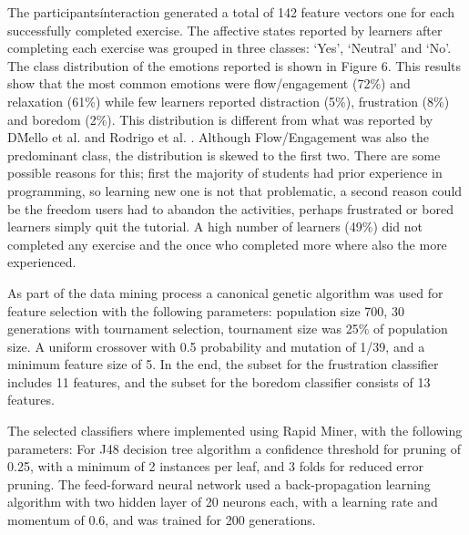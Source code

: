 \documentclass[a4paper,twoside]{article}
\begin{document}
The participants\' interaction generated a total of 142 feature vectors one for each
successfully completed exercise. The affective states reported by learners after
completing each exercise was grouped in three classes: ‘Yes’, ‘Neutral’ and
‘No’. The class distribution of the emotions reported is shown in Figure 6. This
results show that the most common emotions were flow/engagement (72\%) and
relaxation (61\%) while few learners reported distraction (5\%), frustration
(8\%) and boredom (2\%). This distribution is different from what was reported
by D\'Mello et al. \cite{bixler2013detecting} and Rodrigo et al. \cite{rodrigo2009affective}.
Although Flow/Engagement was
also the predominant class, the distribution is skewed to the first two. There
are some possible reasons for this; first the majority of students had
prior experience in programming, so learning new one is not that problematic, a second
reason could be the freedom users had to abandon the activities, perhaps
frustrated or bored learners simply quit the tutorial. A high number of learners
(49\%) did not completed any exercise and the once who completed more where also
the more experienced.

As part of the data mining process a canonical genetic algorithm was used for feature
selection with the following parameters: population size 700, 30 generations with
tournament selection, tournament size was 25\% of population size. A uniform crossover 
with 0.5 probability and mutation of 1/39, and a minimum feature size of 5.
In the end, the subset for the frustration classifier includes 11 features, and the subset for the boredom classifier consists of
13 features.

The selected classifiers where implemented using Rapid Miner, with the following parameters:
For J48 decision tree algorithm a confidence threshold for pruning of 0.25, with a
minimum of 2 instances per leaf, and 3 folds for reduced error pruning. The feed-forward 
neural network used a back-propagation learning algorithm with two hidden layer of 20 neurons
each, with a learning rate and momentum of 0.6, and was trained for 200 generations.
\end{document}
